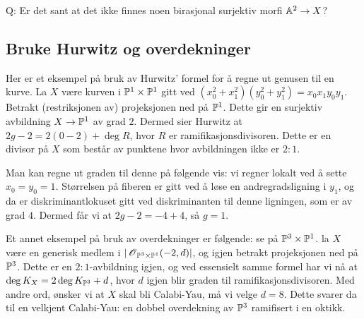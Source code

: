 \documentclass[11pt, norsk]{article}
\begin{document}
Q: Er det sant at det ikke finnes noen birasjonal surjektiv morfi $\mathbb{A}^2 \to X$? 

\subsection{Bruke Hurwitz og overdekninger}

Her er et eksempel på bruk av Hurwitz' formel for å regne ut genusen til en kurve. La $X$ være kurven i $\mathbb{P}^1 \times \mathbb{P}^1$ gitt ved $(x_0^2+x_1^2)(y_0^2+y_1^2)=x_0x_1y_0y_1$. Betrakt (restriksjonen av) projeksjonen ned på $\mathbb{P}^1$. Dette gir en surjektiv avbildning $X \to \mathbb{P}^1$ av grad $2$. Dermed sier Hurwitz at $2g-2=2(0-2)+\deg R$, hvor $R$ er ramifikasjonsdivisoren. Dette er en divisor på $X$ som består av punktene hvor avbildningen ikke er $2:1$. 

Man kan regne ut graden til denne på følgende vis: vi regner lokalt ved å sette $x_0=y_0=1$. Størrelsen på fiberen er gitt ved å løse en andregradsligning i $y_1$, og da er diskriminantlokuset gitt ved diskriminanten til denne ligningen, som er av grad $4$. Dermed får vi at $2g-2=-4+4$, så $g=1$.

Et annet eksempel på bruk av overdekninger er følgende: se på $\mathbb{P}^3 \times \mathbb{P}^1$. la $X$ være en generisk medlem i $|\operatorname{\mathscr{O}}_{\mathbb{P}^3 \times \mathbb{P}^1}(-2,d)|$, og igjen betrakt projeksjonen ned på $\mathbb{P}^3$. Dette er en $2:1$-avbildning igjen, og ved essensielt samme formel har vi nå at $\deg K_X = 2 \deg  K_{\mathbb{P}^3} + d$, hvor $d$ igjen blir graden til ramifikasjonsdivisoren. Med andre ord, ønsker vi at $X$ skal bli Calabi-Yau, må vi velge $d=8$. Dette svarer da til en velkjent Calabi-Yau: en dobbel overdekning av $\mathbb{P}^3$ ramifisert i en oktikk.
\end{document}
